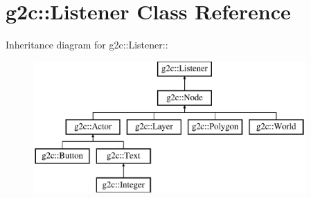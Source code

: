 \hypertarget{classg2c_1_1_listener}{
\section{g2c::Listener Class Reference}
\label{classg2c_1_1_listener}
}
Inheritance diagram for g2c::Listener::\begin{figure}[H]
\begin{center}
\leavevmode
\includegraphics[height=5cm]{classg2c_1_1_listener}
\end{center}
\end{figure}

